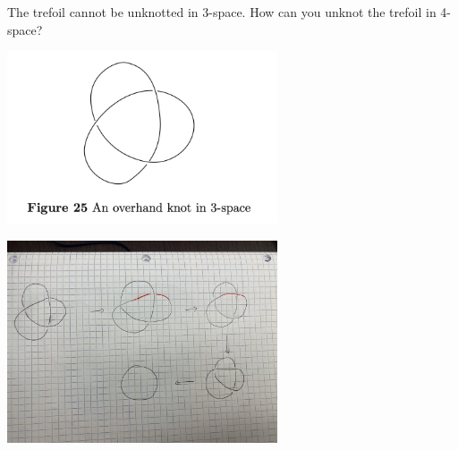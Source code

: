 \documentclass[a4paper, 11pt]{article}
\begin{document}
\begin{problem} [1.48]
The trefoil cannot be unknotted in 3-space. How can you unknot the trefoil in 4-space?
\begin{center}
    \includegraphics[width = 8cm]{figures/figure25.png}
\end{center}
\end{problem}

\begin{solution}

\mbox{}
    \begin{center}
        \includegraphics[width = 8cm]{figures/1.48.jpeg}
    \end{center}
\end{solution}
\end{document}
